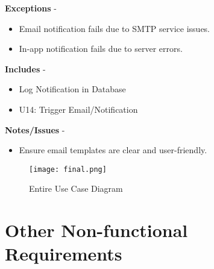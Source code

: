 \documentclass[a4paper,12pt]{article}
\begin{document}
\textbf{Exceptions} - 
\begin{itemize} 
    \item Email notification fails due to SMTP service issues.
    \item In-app notification fails due to server errors.
\end{itemize}
\textbf{Includes} - 
\begin{itemize} 
    \item Log Notification in Database
    \item U14: Trigger Email/Notification
\end{itemize}
\textbf{Notes/Issues} - 
\begin{itemize} 
    \item Ensure email templates are clear and user-friendly.
   
\end{itemize}
\begin{figure}[h!]
    \centering
    \texttt{[image: final.png]}
    \caption{Entire Use Case Diagram}
    \label{Figure 4: Entire Use Case Diagram}
\end{figure}

\clearpage

\section{Other Non-functional Requirements} \label{sec:nonfunctional}
\end{document}
